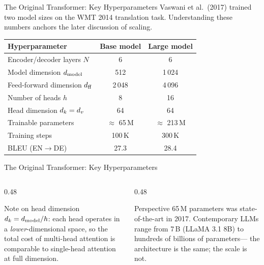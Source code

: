 \documentclass[aspectratio=169]{beamer}
\begin{document}
%
%
\begin{frame}{The Original Transformer: Key Hyperparameters}
\small
Vaswani et al.\ (2017) trained two model sizes on the WMT 2014 translation task.
Understanding these numbers anchors the later discussion of scaling.

\bigskip
\begin{center}
\renewcommand{\arraystretch}{1.25}
\begin{tabular}{@{}lcc@{}}
  \toprule
  \textbf{Hyperparameter} & \textbf{Base model} & \textbf{Large model} \\
  \midrule
  Encoder/decoder layers $N$    & 6      & 6      \\
  Model dimension $d_{\mathrm{model}}$     & 512    & 1\,024 \\
  Feed-forward dimension $d_{\mathrm{ff}}$ & 2\,048 & 4\,096 \\
  Number of heads $h$           & 8      & 16     \\
  Head dimension $d_k = d_v$    & 64     & 64     \\
  \midrule
  Trainable parameters          & $\approx$ 65\,M  & $\approx$ 213\,M \\
  Training steps                & 100\,K & 300\,K \\
  \midrule
  BLEU (EN$\to$DE)              & 27.3   & 28.4   \\
  \bottomrule
\end{tabular}
\end{center}
\end{frame}
%
%
\begin{frame}{The Original Transformer: Key Hyperparameters}
\begin{columns}[T]
\begin{column}{0.48\textwidth}
\begin{block}{Note on head dimension}
  $d_k = d_{\mathrm{model}} / h$:
  each head operates in a \emph{lower}-dimensional space,
  so the total cost of multi-head attention is comparable
  to single-head attention at full dimension.
\end{block}
\end{column}
\begin{column}{0.48\textwidth}
\begin{alertblock}{Perspective}
  65\,M parameters was state-of-the-art in 2017.
  Contemporary LLMs range from 7\,B (LLaMA 3.1 8B)
  to hundreds of billions of parameters—
  the architecture is the same; the scale is not.
\end{alertblock}
\end{column}
\end{columns}

\end{frame}
\end{document}
